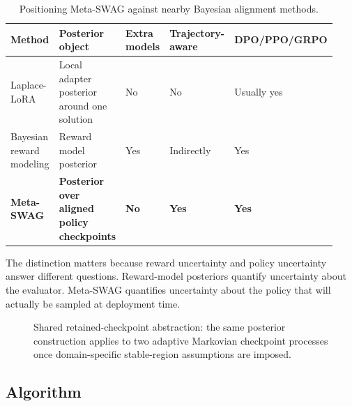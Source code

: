 \documentclass[10pt]{article}
\theoremstyle{plain}
\theoremstyle{definition}
\theoremstyle{remark}
\begin{document}
\begin{table}[H]
\centering
\small
\begin{tabular}{>{\raggedright\arraybackslash}p{0.22\linewidth} >{\raggedright\arraybackslash}p{0.24\linewidth} >{\centering\arraybackslash}p{0.15\linewidth} >{\centering\arraybackslash}p{0.15\linewidth} >{\centering\arraybackslash}p{0.17\linewidth}}
\toprule
Method & Posterior object & Extra models & Trajectory-aware & DPO/PPO/GRPO \\
\midrule
Laplace-LoRA & Local adapter posterior around one solution & No & No & Usually yes \\
Bayesian reward modeling & Reward model posterior & Yes & Indirectly & Yes \\
\textbf{Meta-SWAG} & \textbf{Posterior over aligned policy checkpoints} & \textbf{No} & \textbf{Yes} & \textbf{Yes} \\
\bottomrule
\end{tabular}
\caption{Positioning Meta-SWAG against nearby Bayesian alignment methods.}
\end{table}

The distinction matters because reward uncertainty and policy uncertainty answer different questions. Reward-model posteriors quantify uncertainty about the evaluator. Meta-SWAG quantifies uncertainty about the policy that will actually be sampled at deployment time.

\begin{figure}[H]
\centering
{}
\caption{Shared retained-checkpoint abstraction: the same posterior construction applies to two adaptive Markovian checkpoint processes once domain-specific stable-region assumptions are imposed.}
\end{figure}

\subsection{Algorithm}
\end{document}
